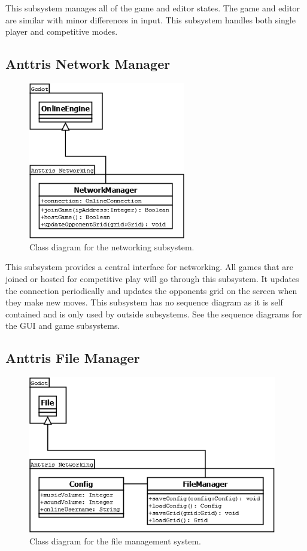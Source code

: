\documentclass[12pt]{article}
\begin{document}
This subsystem manages all of the game and editor states. The game and editor are similar with minor differences in input. This subsystem handles both single player and competitive modes.

\subsection{Anttris Network Manager} %
    \begin{figure}[H]
        \centering
        \includegraphics[width=2.7in]{Anttris_NetworkingClass.png}
        \caption{Class diagram for the networking subsystem.}
    \end{figure}

This subsystem provides a central interface for networking. All games that are joined or hosted for competitive play will go through this subsystem. It updates the connection periodically and updates the opponents grid on the screen when they make new moves. This subsystem has no sequence diagram as it is self contained and is only used by outside subsystems. See the sequence diagrams for the GUI and game subsystems.

\subsection{Anttris File Manager} %
    \begin{figure}[H]
        \centering
        \includegraphics[width=4.27in]{Anttris_FileClass.png}
        \caption{Class diagram for the file management system.}
    \end{figure}
\end{document}
